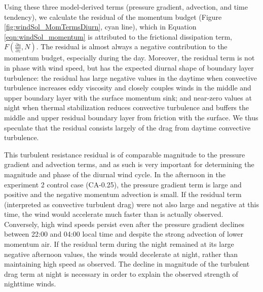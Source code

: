 Using these three model-derived terms (pressure gradient, advection, and time tendency), we calculate the residual of the momentum budget (Figure \ref{fig:windSol_MomTermsDiurn}, cyan line), which in Equation \ref{eqn:windSol_momentum} is attributed to the frictional dissipation term, $F\left(\frac{\partial u}{\partial z}, N\right)$. The residual is almost always a negative contribution to the momentum budget, especially during the day.  Moreover, the residual term is not in phase with wind speed, but has the expected diurnal shape of boundary layer turbulence: the residual has large negative values in the daytime when convective turbulence increases eddy viscosity and closely couples winds in the middle and upper boundary layer with the surface momentum sink; and near-zero values at night when thermal stabilization reduces convective turbulence and buffers the middle and upper residual boundary layer from friction with the surface.  We thus speculate that the residual consists largely of the drag from daytime convective turbulence.

This turbulent resistance residual is of comparable magnitude to the pressure gradient and advection terms, and as such is very important for determining the magnitude and phase of the diurnal wind cycle.  In the afternoon in the experiment 2 control case (CA-0.25), the pressure gradient term is large and positive and the negative momentum advection is small.  If the residual term (interpreted as convective turbulent drag) were not also large and negative at this time, the wind would accelerate much faster than is actually observed.  Conversely, high wind speeds persist even after the pressure gradient declines between 22:00 and 04:00 local time and despite the strong advection of lower momentum air.  If the residual term during the night remained at its large negative afternoon  values, the winds would decelerate at night, rather than maintaining high speed as observed.  The decline in magnitude of the turbulent drag term at night is necessary in order to explain the observed strength of nighttime winds.

